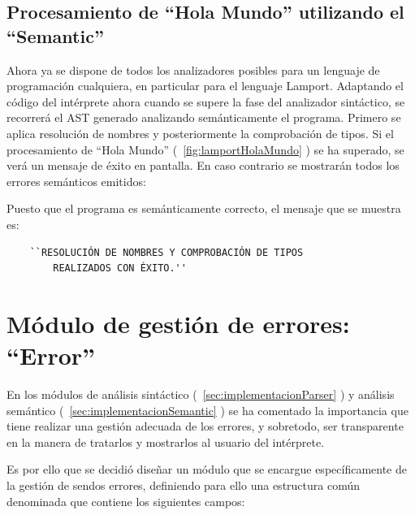 \subsection{Procesamiento de ``Hola Mundo'' utilizando el ``Semantic''}
Ahora ya se dispone de todos los analizadores posibles para un lenguaje de programación cualquiera, en particular para el lenguaje Lamport. Adaptando el código del intérprete ahora cuando se supere la fase del analizador sintáctico, se recorrerá el AST generado analizando semánticamente el programa. Primero se aplica resolución de nombres y posteriormente la comprobación de tipos. Si el procesamiento de ``Hola Mundo'' (~\ref{fig:lamportHolaMundo} ) se ha superado, se verá un mensaje de éxito en pantalla. En caso contrario se mostrarán todos los errores semánticos emitidos:

\vspace{0.5cm}

\noindent
Puesto que el programa es semánticamente correcto, el mensaje que se muestra es:
\begin{verbatim}
    ``RESOLUCIÓN DE NOMBRES Y COMPROBACIÓN DE TIPOS 
        REALIZADOS CON ÉXITO.''
\end{verbatim}

\section{Módulo de gestión de errores: ``Error''}\label{sec:implementacionError}
En los módulos de análisis sintáctico (~\ref{sec:implementacionParser} ) y análisis semántico (~\ref{sec:implementacionSemantic} ) se ha comentado la importancia que tiene realizar una gestión adecuada de los errores, y sobretodo, ser transparente en la manera de tratarlos y mostrarlos al usuario del intérprete.

\vspace{0.5cm}
Es por ello que se decidió diseñar un módulo que se encargue específicamente de la gestión de sendos errores, definiendo para ello una estructura común denominada  que contiene los siguientes campos:

